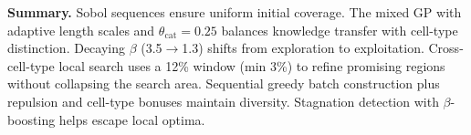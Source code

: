 \documentclass[11pt,a4paper]{article}
\begin{document}
\vspace{0.3em}
\noindent\textbf{Summary.}
Sobol sequences ensure uniform initial coverage.
The mixed GP with adaptive length scales and $\theta_{\text{cat}}=0.25$ balances knowledge transfer with cell-type distinction.
Decaying $\beta$ (3.5$\to$1.3) shifts from exploration to exploitation.
Cross-cell-type local search uses a 12\% window (min 3\%) to refine promising regions without collapsing the search area.
Sequential greedy batch construction plus repulsion and cell-type bonuses maintain diversity.
Stagnation detection with $\beta$-boosting helps escape local optima.
\end{document}
